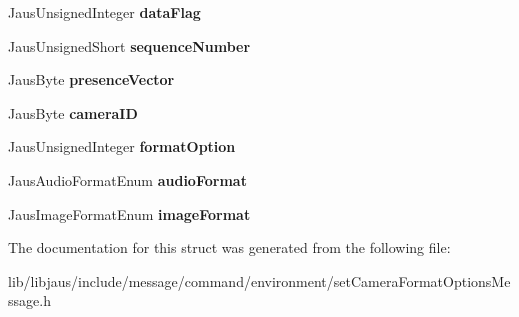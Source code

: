 \begin{DoxyCompactItemize}
\item 
\hypertarget{struct_set_camera_format_options_message_struct_a2079a4140ccd6ba0cd06f274e9795147}{\-Jaus\-Unsigned\-Integer {\bfseries data\-Flag}}\label{struct_set_camera_format_options_message_struct_a2079a4140ccd6ba0cd06f274e9795147}

\item 
\hypertarget{struct_set_camera_format_options_message_struct_a3b4771c68e90287f60a075441548b0a6}{\-Jaus\-Unsigned\-Short {\bfseries sequence\-Number}}\label{struct_set_camera_format_options_message_struct_a3b4771c68e90287f60a075441548b0a6}

\item 
\hypertarget{struct_set_camera_format_options_message_struct_a79a9ce183544909cb65ccdca54aaa6ed}{\-Jaus\-Byte {\bfseries presence\-Vector}}\label{struct_set_camera_format_options_message_struct_a79a9ce183544909cb65ccdca54aaa6ed}

\item 
\hypertarget{struct_set_camera_format_options_message_struct_a65cd0adb594b202714178b06cf1875e1}{\-Jaus\-Byte {\bfseries camera\-I\-D}}\label{struct_set_camera_format_options_message_struct_a65cd0adb594b202714178b06cf1875e1}

\item 
\hypertarget{struct_set_camera_format_options_message_struct_a70c42a3960adfddd86fc1c0ea757980a}{\-Jaus\-Unsigned\-Integer {\bfseries format\-Option}}\label{struct_set_camera_format_options_message_struct_a70c42a3960adfddd86fc1c0ea757980a}

\item 
\hypertarget{struct_set_camera_format_options_message_struct_a7353bd112642bfbea87c310b12c24d87}{\-Jaus\-Audio\-Format\-Enum {\bfseries audio\-Format}}\label{struct_set_camera_format_options_message_struct_a7353bd112642bfbea87c310b12c24d87}

\item 
\hypertarget{struct_set_camera_format_options_message_struct_a43f92726ed4a306246829c6fa5a231b0}{\-Jaus\-Image\-Format\-Enum {\bfseries image\-Format}}\label{struct_set_camera_format_options_message_struct_a43f92726ed4a306246829c6fa5a231b0}

\end{DoxyCompactItemize}


\-The documentation for this struct was generated from the following file\-:\begin{DoxyCompactItemize}
\item 
lib/libjaus/include/message/command/environment/set\-Camera\-Format\-Options\-Message.\-h\end{DoxyCompactItemize}

